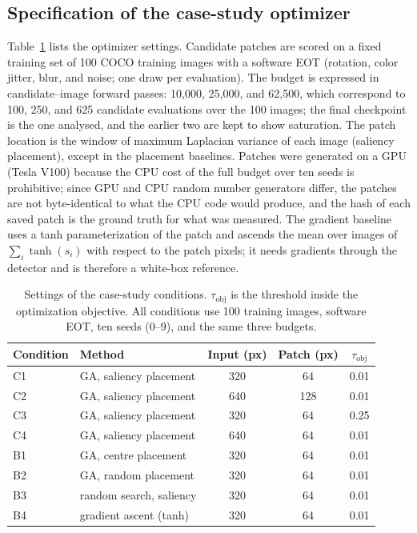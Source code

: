 \documentclass[a4paper,fleqn]{cas-dc}
\begin{document}
\subsection{Specification of the case-study optimizer}
Table~\ref{tab:spec} lists the optimizer settings. Candidate patches are scored on a fixed training set of 100 COCO training images with a software EOT (rotation, color jitter, blur, and noise; one draw per evaluation). The budget is expressed in candidate--image forward passes: 10{,}000, 25{,}000, and 62{,}500, which correspond to 100, 250, and 625 candidate evaluations over the 100 images; the final checkpoint is the one analysed, and the earlier two are kept to show saturation. The patch location is the window of maximum Laplacian variance of each image (saliency placement), except in the placement baselines. Patches were generated on a GPU (Tesla V100) because the CPU cost of the full budget over ten seeds is prohibitive; since GPU and CPU random number generators differ, the patches are not byte-identical to what the CPU code would produce, and the hash of each saved patch is the ground truth for what was measured. The gradient baseline uses a tanh parameterization of the patch and ascends the mean over images of $\sum_i \tanh(s_i)$ with respect to the patch pixels; it needs gradients through the detector and is therefore a white-box reference.

\begin{table}[t]
\centering\small
\caption{Settings of the case-study conditions. $\tau_{\mathrm{obj}}$ is the threshold inside the optimization objective. All conditions use 100 training images, software EOT, ten seeds (0--9), and the same three budgets.}
\label{tab:spec}
\begin{tabular}{@{}llccc@{}}
\toprule
Condition & Method & Input (px) & Patch (px) & $\tau_{\mathrm{obj}}$ \\
\midrule
C1 & GA, saliency placement & 320 & 64 & 0.01 \\
C2 & GA, saliency placement & 640 & 128 & 0.01 \\
C3 & GA, saliency placement & 320 & 64 & 0.25 \\
C4 & GA, saliency placement & 640 & 64 & 0.01 \\
B1 & GA, centre placement & 320 & 64 & 0.01 \\
B2 & GA, random placement & 320 & 64 & 0.01 \\
B3 & random search, saliency & 320 & 64 & 0.01 \\
B4 & gradient ascent (tanh) & 320 & 64 & 0.01 \\
\bottomrule
\end{tabular}
\end{table}
\end{document}
